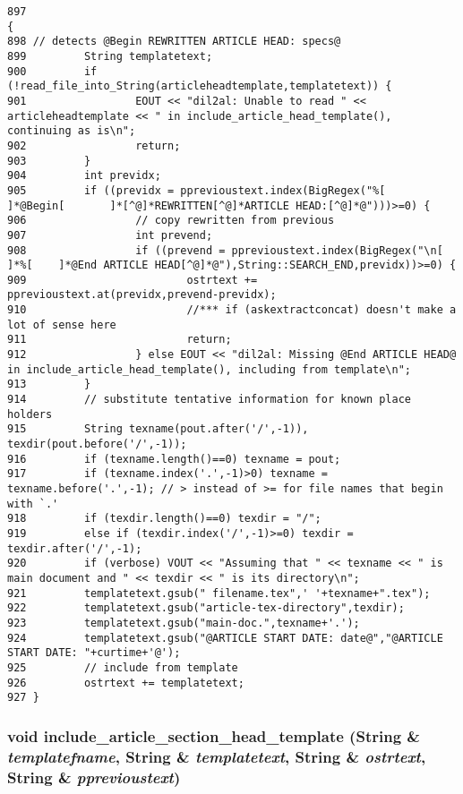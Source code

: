 \footnotesize\begin{verbatim}897                                                                                              {
898 // detects @Begin REWRITTEN ARTICLE HEAD: specs@
899         String templatetext;
900         if (!read_file_into_String(articleheadtemplate,templatetext)) {
901                 EOUT << "dil2al: Unable to read " << articleheadtemplate << " in include_article_head_template(), continuing as is\n";
902                 return;
903         }
904         int previdx;
905         if ((previdx = pprevioustext.index(BigRegex("%[         ]*@Begin[       ]*[^@]*REWRITTEN[^@]*ARTICLE HEAD:[^@]*@")))>=0) {
906                 // copy rewritten from previous
907                 int prevend;
908                 if ((prevend = pprevioustext.index(BigRegex("\n[        ]*%[    ]*@End ARTICLE HEAD[^@]*@"),String::SEARCH_END,previdx))>=0) {
909                         ostrtext += pprevioustext.at(previdx,prevend-previdx);
910                         //*** if (askextractconcat) doesn't make a lot of sense here
911                         return;
912                 } else EOUT << "dil2al: Missing @End ARTICLE HEAD@ in include_article_head_template(), including from template\n";
913         }
914         // substitute tentative information for known place holders
915         String texname(pout.after('/',-1)), texdir(pout.before('/',-1));
916         if (texname.length()==0) texname = pout;
917         if (texname.index('.',-1)>0) texname = texname.before('.',-1); // > instead of >= for file names that begin with `.'
918         if (texdir.length()==0) texdir = "/";
919         else if (texdir.index('/',-1)>=0) texdir = texdir.after('/',-1);
920         if (verbose) VOUT << "Assuming that " << texname << " is main document and " << texdir << " is its directory\n";
921         templatetext.gsub(" filename.tex",' '+texname+".tex");
922         templatetext.gsub("article-tex-directory",texdir);
923         templatetext.gsub("main-doc.",texname+'.');
924         templatetext.gsub("@ARTICLE START DATE: date@","@ARTICLE START DATE: "+curtime+'@');
925         // include from template
926         ostrtext += templatetext;
927 }
\end{verbatim}\normalsize 
{}
\subsubsection{\setlength{\rightskip}{0pt plus 5cm}void include\_\-article\_\-section\_\-head\_\-template ({\bf String} \& {\em templatefname}, {\bf String} \& {\em templatetext}, {\bf String} \& {\em ostrtext}, {\bf String} \& {\em pprevioustext})}\label{ppfilter_8cc_a24}





